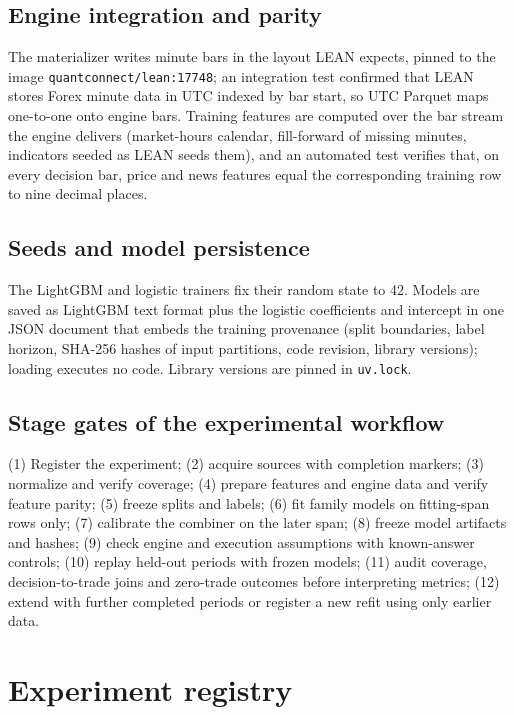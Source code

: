 \begin{apendicesenv}
\section*{Engine integration and parity}

The materializer writes minute bars in the layout LEAN expects, pinned to the image \texttt{quantconnect/lean:17748}; an integration test confirmed that LEAN stores Forex minute data in UTC indexed by bar start, so UTC Parquet maps one-to-one onto engine bars. Training features are computed over the bar stream the engine delivers (market-hours calendar, fill-forward of missing minutes, indicators seeded as LEAN seeds them), and an automated test verifies that, on every decision bar, price and news features equal the corresponding training row to nine decimal places.

\section*{Seeds and model persistence}

The LightGBM and logistic trainers fix their random state to 42. Models are saved as LightGBM text format plus the logistic coefficients and intercept in one JSON document that embeds the training provenance (split boundaries, label horizon, SHA-256 hashes of input partitions, code revision, library versions); loading executes no code. Library versions are pinned in \texttt{uv.lock}.

\section*{Stage gates of the experimental workflow}

(1) Register the experiment; (2) acquire sources with completion markers; (3) normalize and verify coverage; (4) prepare features and engine data and verify feature parity; (5) freeze splits and labels; (6) fit family models on fitting-span rows only; (7) calibrate the combiner on the later span; (8) freeze model artifacts and hashes; (9) check engine and execution assumptions with known-answer controls; (10) replay held-out periods with frozen models; (11) audit coverage, decision-to-trade joins and zero-trade outcomes before interpreting metrics; (12) extend with further completed periods or register a new refit using only earlier data.

\chapter{Experiment registry} \label{app:experiment-registry}


\end{apendicesenv}
